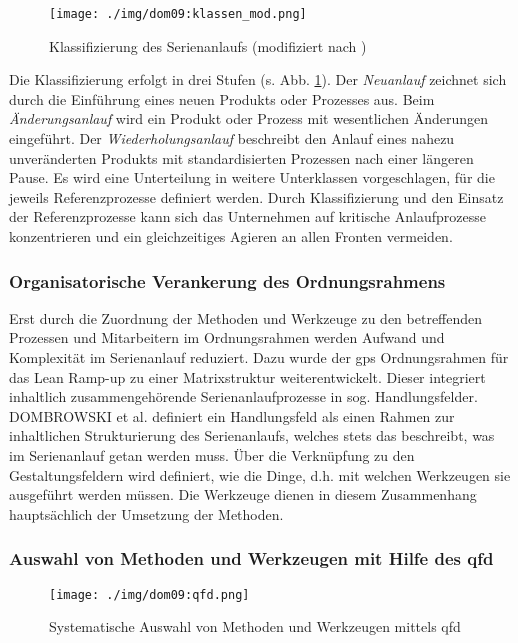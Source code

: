 \begin{figure}[ht]
 \centering
 \texttt{[image: ./img/dom09:klassen\_mod.png]}
 \caption[Klassifizierung des Serienanlaufs]{Klassifizierung des Serienanlaufs (modifiziert nach \cite{Dombrowski2009})}
 \label{fig:anlaufklassen}
\end{figure}

Die Klassifizierung erfolgt in drei Stufen (s. Abb. \ref{fig:anlaufklassen}). 
Der \textit{Neuanlauf} zeichnet sich durch die Einführung eines neuen Produkts oder Prozesses aus. 
Beim \textit{Änderungsanlauf} wird ein Produkt oder Prozess mit wesentlichen Änderungen eingeführt. Der \textit{Wiederholungsanlauf} beschreibt den Anlauf eines nahezu unveränderten Produkts mit standardisierten Prozessen nach einer längeren Pause. 
Es wird eine Unterteilung in weitere Unterklassen vorgeschlagen, für die jeweils Referenzprozesse definiert werden. 
Durch Klassifizierung und den Einsatz der Referenzprozesse kann sich das Unternehmen auf kritische Anlaufprozesse konzentrieren und ein gleichzeitiges Agieren an allen Fronten vermeiden.

\subsubsection{Organisatorische Verankerung des Ordnungsrahmens}
Erst durch die Zuordnung der Methoden und Werkzeuge zu den betreffenden Prozessen und Mitarbeitern im Ordnungsrahmen werden Aufwand und Komplexität im Serienanlauf reduziert. Dazu wurde der \gls{gps} Ordnungsrahmen für das Lean Ramp-up zu einer Matrixstruktur weiterentwickelt. Dieser integriert inhaltlich zusammengehörende Serienanlaufprozesse in sog. Handlungsfelder. DOMBROWSKI et al. definiert ein Handlungsfeld als einen Rahmen zur inhaltlichen Strukturierung des Serienanlaufs, welches stets das beschreibt, was im Serienanlauf getan werden muss. Über die Verknüpfung zu den Gestaltungsfeldern wird definiert, wie die Dinge, d.h. mit welchen Werkzeugen sie ausgeführt werden müssen. Die Werkzeuge dienen in diesem Zusammenhang hauptsächlich der Umsetzung der Methoden. 

\subsubsection{Auswahl von Methoden und Werkzeugen mit Hilfe des \gls{qfd}}

\begin{figure}[ht]
 \centering
 \texttt{[image: ./img/dom09:qfd.png]}
 \caption[Systematische Auswahl von Methoden und Werkzeugen mittels \gls{qfd}]{Systematische Auswahl von Methoden und Werkzeugen mittels \gls{qfd} \autocite{Dombrowski2009}}
 \label{fig:qfd}
\end{figure}

